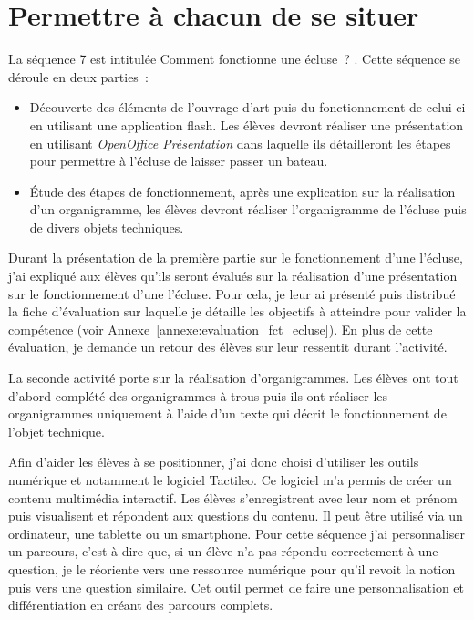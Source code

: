 \section{Permettre à chacun de se situer }

La séquence 7 est intitulée \og Comment fonctionne une écluse~? \fg{}.
Cette séquence se déroule en deux parties~:
\begin{itemize}
\item Découverte des éléments de l'ouvrage d'art puis du fonctionnement de celui-ci en utilisant une application flash. Les élèves devront réaliser une présentation en utilisant \textit{OpenOffice Présentation} dans laquelle ils détailleront les étapes pour permettre à l'écluse de laisser passer un bateau.
\item Étude des étapes de fonctionnement, après une explication sur la réalisation d'un organigramme, les élèves devront réaliser l'organigramme de l'écluse puis de divers objets techniques.
\end{itemize} 

Durant la présentation de la première partie sur le fonctionnement d'une l'écluse, j'ai expliqué aux élèves qu'ils seront évalués sur la réalisation d'une présentation sur le fonctionnement d'une l'écluse.
Pour cela, je leur ai présenté puis distribué la fiche d'évaluation sur laquelle je détaille les objectifs à atteindre pour valider la compétence (voir Annexe~\ref{annexe:evaluation_fct_ecluse}).
En plus de cette évaluation, je demande un retour des élèves sur leur ressentit durant l'activité.

La seconde activité porte sur la réalisation d'organigrammes.
Les élèves ont tout d'abord complété des organigrammes à trous puis ils ont réaliser les organigrammes uniquement à l'aide d'un texte qui décrit le fonctionnement de l'objet technique.

Afin d'aider les élèves à se positionner, j'ai donc choisi d'utiliser les outils numérique et notamment le logiciel Tactileo. 
Ce logiciel m'a permis de créer un contenu multimédia interactif.
Les élèves s'enregistrent avec leur nom et prénom puis visualisent et répondent aux questions du contenu.
Il peut être utilisé via un ordinateur, une tablette ou un smartphone.
Pour cette séquence j'ai personnaliser un parcours, c'est-à-dire que, si un élève n'a pas répondu correctement à une question, je le réoriente vers une ressource numérique pour qu'il revoit la notion puis vers une question similaire. Cet outil permet de faire une personnalisation et différentiation en créant des parcours complets.

